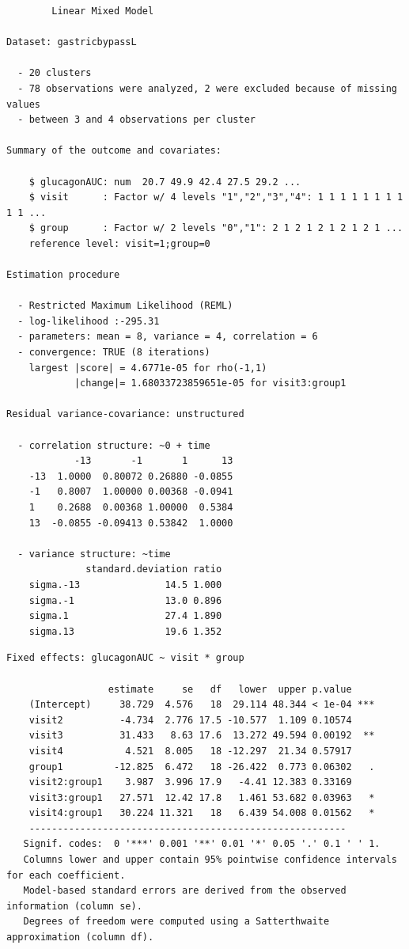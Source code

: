 \documentclass[12pt]{article}
\begin{document}
\begin{verbatim}
		Linear Mixed Model 
 
Dataset: gastricbypassL 

  - 20 clusters 
  - 78 observations were analyzed, 2 were excluded because of missing values 
  - between 3 and 4 observations per cluster 

Summary of the outcome and covariates: 

    $ glucagonAUC: num  20.7 49.9 42.4 27.5 29.2 ...
    $ visit      : Factor w/ 4 levels "1","2","3","4": 1 1 1 1 1 1 1 1 1 1 ...
    $ group      : Factor w/ 2 levels "0","1": 2 1 2 1 2 1 2 1 2 1 ...
    reference level: visit=1;group=0 

Estimation procedure 

  - Restricted Maximum Likelihood (REML) 
  - log-likelihood :-295.31
  - parameters: mean = 8, variance = 4, correlation = 6
  - convergence: TRUE (8 iterations) 
    largest |score| = 4.6771e-05 for rho(-1,1)
            |change|= 1.68033723859651e-05 for visit3:group1
 
Residual variance-covariance: unstructured 

  - correlation structure: ~0 + time 
            -13       -1       1      13
    -13  1.0000  0.80072 0.26880 -0.0855
    -1   0.8007  1.00000 0.00368 -0.0941
    1    0.2688  0.00368 1.00000  0.5384
    13  -0.0855 -0.09413 0.53842  1.0000

  - variance structure: ~time 
              standard.deviation ratio
    sigma.-13               14.5 1.000
    sigma.-1                13.0 0.896
    sigma.1                 27.4 1.890
    sigma.13                19.6 1.352
\end{verbatim}

\clearpage

\begin{verbatim}
Fixed effects: glucagonAUC ~ visit * group 
 
                  estimate     se   df   lower  upper p.value    
    (Intercept)     38.729  4.576   18  29.114 48.344 < 1e-04 ***
    visit2          -4.734  2.776 17.5 -10.577  1.109 0.10574    
    visit3          31.433   8.63 17.6  13.272 49.594 0.00192  **
    visit4           4.521  8.005   18 -12.297  21.34 0.57917    
    group1         -12.825  6.472   18 -26.422  0.773 0.06302   .
    visit2:group1    3.987  3.996 17.9   -4.41 12.383 0.33169    
    visit3:group1   27.571  12.42 17.8   1.461 53.682 0.03963   *
    visit4:group1   30.224 11.321   18   6.439 54.008 0.01562   *
    -------------------------------------------------------- 
   Signif. codes:  0 '***' 0.001 '**' 0.01 '*' 0.05 '.' 0.1 ' ' 1.
   Columns lower and upper contain 95% pointwise confidence intervals for each coefficient.
   Model-based standard errors are derived from the observed information (column se). 
   Degrees of freedom were computed using a Satterthwaite approximation (column df).
\end{verbatim}
\end{document}
